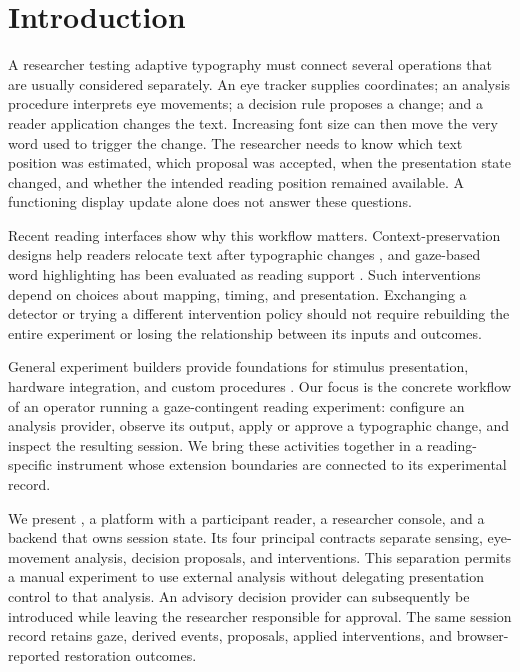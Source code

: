 \section{Introduction}
\label{sec:introduction}

A researcher testing adaptive typography must connect several operations that are usually considered separately. An eye tracker supplies coordinates; an analysis procedure interprets eye movements; a decision rule proposes a change; and a reader application changes the text. Increasing font size can then move the very word used to trigger the change. The researcher needs to know which text position was estimated, which proposal was accepted, when the presentation state changed, and whether the intended reading position remained available. A functioning display update alone does not answer these questions.

Recent reading interfaces show why this workflow matters. Context-preservation designs help readers relocate text after typographic changes \citep{jensen2025context}, and gaze-based word highlighting has been evaluated as reading support \citep{rummens2026highlighting}. Such interventions depend on choices about mapping, timing, and presentation. Exchanging a detector or trying a different intervention policy should not require rebuilding the entire experiment or losing the relationship between its inputs and outcomes.

General experiment builders provide foundations for stimulus presentation, hardware integration, and custom procedures \citep{peirce2019psychopy,mathot2012opensesame}. Our focus is the concrete workflow of an operator running a gaze-contingent reading experiment: configure an analysis provider, observe its output, apply or approve a typographic change, and inspect the resulting session. We bring these activities together in a reading-specific instrument whose extension boundaries are connected to its experimental record.

We present \rtr{}, a platform with a participant reader, a researcher console, and a backend that owns session state. Its four principal contracts separate sensing, eye-movement analysis, decision proposals, and interventions. This separation permits a manual experiment to use external analysis without delegating presentation control to that analysis. An advisory decision provider can subsequently be introduced while leaving the researcher responsible for approval. The same session record retains gaze, derived events, proposals, applied interventions, and browser-reported restoration outcomes.

